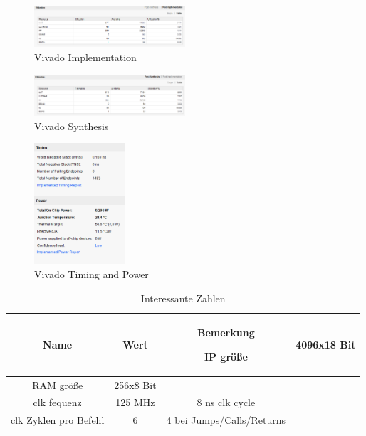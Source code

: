 \documentclass[bibliography=totoc,listof=totoc,index=totoc]{scrartcl}
\begin{document}
\begin{multicols}{2}
    \begin{figure}[H]
        \centering
        \includegraphics[width=0.5\textwidth]{VivadoImp.png}
        \caption{Vivado Implementation}
        \label{fig:VivadoImp}
    \end{figure}
    \begin{figure}[H]
        \centering
        \includegraphics[width=0.5\textwidth]{VivadoSyn.png}
        \caption{Vivado Synthesis}
        \label{fig:VivadoSyn}
    \end{figure}
    
    \begin{figure}[H]
        \centering
        \includegraphics[width=0.30\textwidth]{VivadoTimingAndPower.png}
        \caption{Vivado Timing and Power}
        \label{fig:VivadoTimingAndPower}
    \end{figure}
\end{multicols}
\begin{longtable}{||c|c|c||}
        \hline \hline
         Name & Wert & Bemerkung\endhead
         \caption{Interessante Zahlen} \endfoot
         \hline
         IP größe & 4096x18 Bit &\\ \hline
         RAM größe & 256x8 Bit &\\ \hline
         clk fequenz & 125 MHz & 8 ns clk cycle\\ \hline
         clk Zyklen pro Befehl & 6 & 4 bei Jumps/Calls/Returns\\ \hline
    \end{longtable}
%
\end{document}
